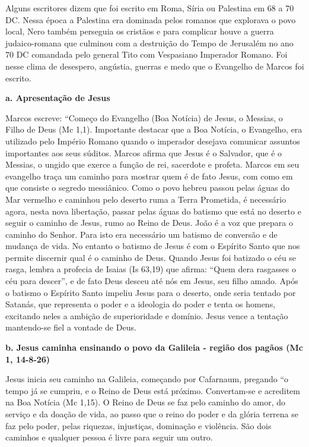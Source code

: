 \documentclass[
]{book}
\begin{document}
Alguns escritores dizem que foi escrito em Roma, Síria ou Palestina em 68 a 70 DC. Nessa época a Palestina era dominada pelos romanos que explorava o povo local, Nero também perseguia os cristãos e para complicar houve a guerra judaico-romana que culminou com a destruição do Tempo de Jerusalém no ano 70 DC comandada pelo general Tito com Vespasiano Imperador Romano. Foi nesse clima de desespero, angústia, guerras e medo que o Evangelho de Marcos foi escrito.

\textbf{a. Apresentação de Jesus}

Marcos escreve: ``Começo do Evangelho (Boa Notícia) de Jesus, o Messias, o Filho de Deus (Mc 1,1). Importante destacar que a Boa Notícia, o Evangelho, era utilizado pelo Império Romano quando o imperador desejava comunicar assuntos importantes aos seus súditos. Marcos afirma que Jesus é o Salvador, que é o Messias, o ungido que exerce a função de rei, sacerdote e profeta. Marcos em seu evangelho traça um caminho para mostrar quem é de fato Jesus, com como em que consiste o segredo messiânico. Como o povo hebreu passou pelas águas do Mar vermelho e caminhou pelo deserto ruma a Terra Prometida, é necessário agora, nesta nova libertação, passar pelas águas do batismo que está no deserto e seguir o caminho de Jesus, rumo ao Reino de Deus. João é a voz que prepara o caminho do Senhor. Para isto era necessário um batismo de conversão e de mudança de vida. No entanto o batismo de Jesus é com o Espírito Santo que nos permite discernir qual é o caminho de Deus. Quando Jesus foi batizado o céu se rasga, lembra a profecia de Isaias (Is 63,19) que afirma: ``Quem dera rasgasses o céu para descer'', e de fato Deus desceu até nós em Jesus, seu filho amado. Após o batismo o Espírito Santo impeliu Jesus para o deserto, onde seria tentado por Satanás, que representa o poder e a ideologia do poder e tenta os homens, excitando neles a ambição de superioridade e domínio. Jesus vence a tentação mantendo-se fiel a vontade de Deus.

\textbf{b. Jesus caminha ensinando o povo da Galileia - região dos pagãos (Mc 1, 14-8-26)}

Jesus inicia seu caminho na Galileia, começando por Cafarnaum, pregando ``o tempo já se cumpriu, e o Reino de Deus está próximo. Convertam-se e acreditem na Boa Notícia (Mc 1,15). O Reino de Deus se faz pelo caminho do amor, do serviço e da doação de vida, ao passo que o reino do poder e da glória terrena se faz pelo poder, pelas riquezas, injustiças, dominação e violência. São dois caminhos e qualquer pessoa é livre para seguir um outro.
\end{document}
